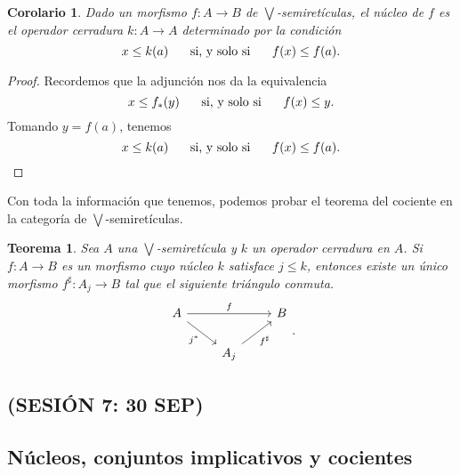 \documentclass[12pt,letterpaper,titlepage]{article}
\newtheorem*{cor}{Corolario}
\newtheorem*{thm}{Teorema}
\theoremstyle{definition}
\newcommand\Sup{\bigvee}
\newcommand\ssi{\hspace{5mm}\text{ si, y solo si }\hspace{5mm}}
\newcommand\<{\langle}
\renewcommand\>{\rangle}
\begin{document}
\begin{cor}
    Dado un morfismo $f:A\to B$ de $\Sup$-semiretículas, el núcleo de $f$
    es el operador cerradura $k:A\to A$ determinado por la condición
    \[
        x\leq k(a) \ssi f(x) \leq f(a)
    .\]
\end{cor}
\begin{proof}
    Recordemos que la adjunción nos da la equivalencia
    \[
        x\leq f_*(y) \ssi f(x) \leq y
    .\]
    Tomando $y=f(a)$, tenemos
    \[
        x\leq k(a) \ssi f(x) \leq f(a)
    .\]
\end{proof}

Con toda la información que tenemos, podemos probar el teorema del cociente
en la categoría de $\Sup$-semiretículas.
\begin{thm}
    Sea $A$ una $\Sup$-semiretícula y $k$ un operador cerradura en $A$.
    Si $f:A\to B$ es un morfismo cuyo núcleo $k$ satisface $j\leq k$,
    entonces existe un único morfismo $f^\sharp:A_j\to B$ tal que
    el siguiente triángulo conmuta.
    \[
        \begin{tikzcd}
            A \ar[rr,"f"] \ar[dr,"j^*"'] &&  B \\
            &A_j \ar[ur,"f^\sharp"']
        \end{tikzcd}
    .\]
\end{thm}
    
\subsection*{(SESIÓN 7: 30 SEP)}

\subsection{Núcleos, conjuntos implicativos y cocientes}
\end{document}
